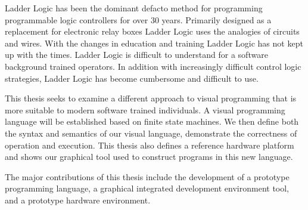 
Ladder Logic has been the dominant defacto method for programming programmable logic controllers for over 30 years. Primarily designed as a replacement for electronic relay boxes Ladder Logic uses the analogies of circuits and wires. With the changes in education and training Ladder Logic has not kept up with the times. Ladder Logic is difficult to understand for a software background trained operators. In addition with increasingly difficult control logic strategies, Ladder Logic has become cumbersome and difficult to use.

This thesis seeks to examine a different approach to visual programming that is more suitable to modern software trained individuals. A visual programming language will be established based on finite state machines. We then define both the syntax and semantics of our visual language, demonstrate the correctness of operation and execution. This thesis also defines a reference hardware platform and shows our graphical tool used to construct programs in this new language.

The major contributions of this thesis include the development of a prototype programming language, a graphical integrated development environment tool, and a prototype hardware environment.